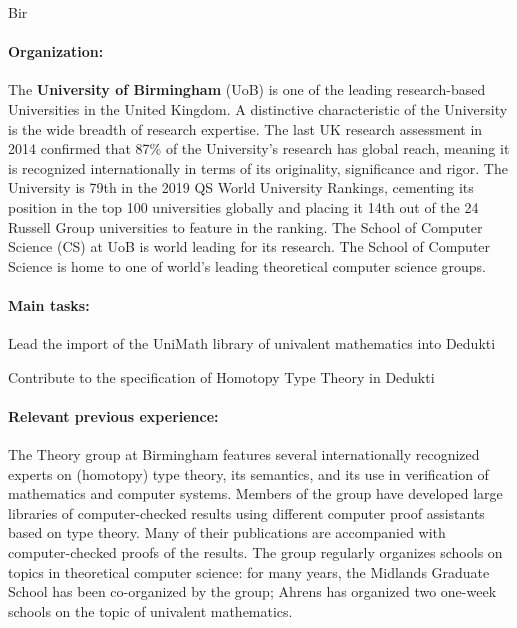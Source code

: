 \begin{sitedescription}{Bir}

\paragraph{Organization:}
The \textbf{University of Birmingham} (UoB) is one of the leading research-based Universities in the United Kingdom. A distinctive
characteristic of the University is the wide breadth of research expertise. The last UK research assessment in 2014 confirmed that
87\% of the University’s research has global reach, meaning it is recognized internationally in terms of its originality, significance and rigor. The University is 79th in the 2019 QS World University Rankings, cementing its position in the top 100 universities globally and placing it 14th out of the 24 Russell Group universities to feature in the ranking. The School of Computer Science (CS) at UoB is world leading for its research. 
The School of Computer Science is home to one of world's leading theoretical computer science groups.

\paragraph{Main tasks:}

\begin{compactitem}
\item Lead the import of the UniMath library of univalent mathematics into Dedukti 
\item Contribute to the specification of Homotopy Type Theory in Dedukti

\item{} 
\end{compactitem}


\paragraph{Relevant previous experience:}
The Theory group at Birmingham features several internationally recognized experts on (homotopy) type theory, its semantics, and its use in verification of mathematics and computer systems.
Members of the group have developed large libraries of computer-checked results using different computer proof assistants based on type theory.
Many of their publications are accompanied with computer-checked proofs of the results.
The group regularly organizes schools on topics in theoretical computer science: for many years, the Midlands Graduate School has been co-organized by the group; Ahrens has organized two one-week schools on the topic of univalent mathematics.


\end{sitedescription}
